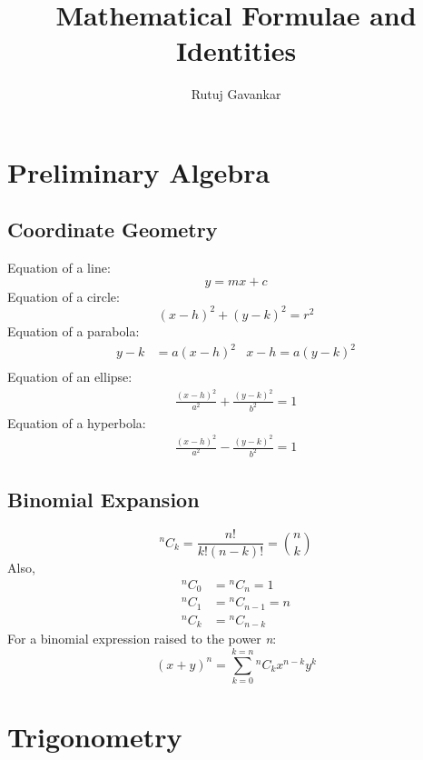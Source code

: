 \documentclass[12pt]{article}
\title{Mathematical Formulae and Identities}
\author{Rutuj Gavankar \\ \email}
\begin{document}
\maketitle
\tableofcontents
\newpage

\section{Preliminary Algebra}

\subsection{Coordinate Geometry}
Equation of a line:
$$y = mx + c$$
Equation of a circle:
$${(x-h)}^2 + {(y-k)}^2 = r^2$$
Equation of a parabola:
\begin{align*}
y - k &= a{(x-h)}^2 & x-h = a{(y-k)^2} \\
\end{align*}
Equation of an ellipse:
\begin{align*}
\frac{{(x-h)}^2}{a^2} + \frac{{(y-k)}^2}{b^2} = 1 
\end{align*}
Equation of a hyperbola:
\begin{align*}
\frac{{(x-h)}^2}{a^2} - \frac{{(y-k)}^2}{b^2} = 1 
\end{align*}

\subsection{Binomial Expansion}
$$^nC_k = \frac{n!}{k!(n-k)!} = {n\choose k} $$
Also,
\begin{align*}
	{^nC_0} &= {^nC_n} = 1 \\
	{^nC_1} &= {^nC_{n-1}} = n \\
	{^nC_k} &= {^nC_{n-k}}
\end{align*}
For a binomial expression raised to the power \emph{n}:
$${(x+y)}^n  = \sum_{k=0}^{k=n} {^nC_k} x^{n-k}y^k$$

\section{Trigonometry}
\end{document}
